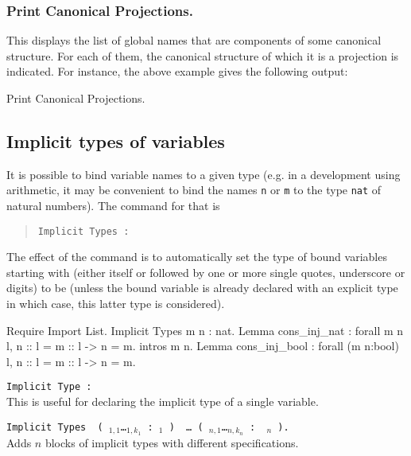 \subsubsection{Print Canonical Projections.
}

This displays the list of global names that are components of some
canonical structure. For each of them, the canonical structure of
which it is a projection is indicated. For instance, the above example 
gives the following output:

\begin{coq_example}
Print Canonical Projections.
\end{coq_example}

\subsection{Implicit types of variables}

It is possible to bind variable names to a given type (e.g. in a
development using arithmetic, it may be convenient to bind the names
{\tt n} or {\tt m} to the type {\tt nat} of natural numbers). The
command for that is
\begin{quote}
\tt Implicit Types \nelist{\ident}{} : {\type}
\end{quote}
The effect of the command is to automatically set the type of bound
variables starting with {\ident} (either {\ident} itself or
{\ident} followed by one or more single quotes, underscore or digits)
to be {\type} (unless the bound variable is already declared with an
explicit type in which case, this latter type is considered).

\Example
\begin{coq_example}
Require Import List.
Implicit Types m n : nat.
Lemma cons_inj_nat : forall m n l, n :: l = m :: l -> n = m.
intros m n.
Lemma cons_inj_bool : forall (m n:bool) l, n :: l = m :: l -> n = m.
\end{coq_example}

\begin{Variants}
\item {\tt Implicit Type {\ident} : {\type}}\\
This is useful for declaring the implicit type of a single variable.
\item
 {\tt Implicit Types\,%
(\,{\ident$_{1,1}$}\ldots{\ident$_{1,k_1}$}\,{\tt :}\,{\term$_1$} {\tt )}\,%
\ldots\,{\tt (}\,{\ident$_{n,1}$}\ldots{\ident$_{n,k_n}$}\,{\tt :}\,%
{\term$_n$} {\tt )}.}\\ 
  Adds $n$ blocks of implicit types with different specifications.
\end{Variants}


